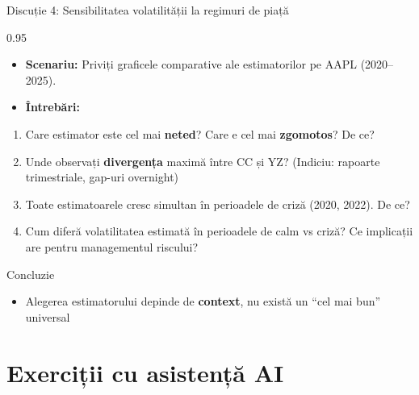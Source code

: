 \documentclass[9pt, aspectratio=169, t]{beamer}
\begin{document}
\begin{frame}[shrink=10]{Discuție 4: Sensibilitatea volatilității la regimuri de piață}
\begin{cminipage}{0.95\textwidth}
    \begin{itemize}\setlength{\itemsep}{0pt}
        \item \textbf{Scenariu:} Priviți graficele comparative ale estimatorilor pe AAPL (2020--2025).
        \item \textbf{Întrebări:}
    \end{itemize}
    \begin{enumerate}\setlength{\itemsep}{0pt}
        \item Care estimator este cel mai \textbf{neted}? Care e cel mai \textbf{zgomotos}? De ce?
        \item Unde observați \textbf{divergența} maximă între CC și YZ? (Indiciu: rapoarte trimestriale, gap-uri overnight)
        \item Toate estimatoarele cresc simultan în perioadele de criză (2020, 2022). De ce?
        \item Cum diferă volatilitatea estimată în perioadele de calm vs criză? Ce implicații are pentru managementul riscului?
    \end{enumerate}

    \vspace{0.2cm}
    \begin{block}{Concluzie}
        \begin{itemize}\setlength{\itemsep}{0pt}
            \item Alegerea estimatorului depinde de \textbf{context}, nu există un ``cel mai bun'' universal
        \end{itemize}
    \end{block}
\end{cminipage}
\end{frame}

\section{Exerciții cu asistență AI}
\end{document}
